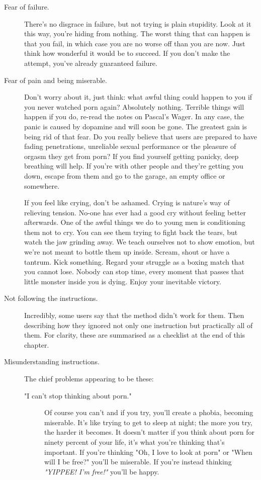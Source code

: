 \documentclass[easypeasy.tex]{subfiles}
\begin{document}
\begin{description}
  \item [Fear of failure.] There's no disgrace in failure, but not trying is plain stupidity. Look at it this way, you're hiding from nothing. The worst thing that can happen is that you fail, in which case you are no worse off than you are now. Just think how wonderful it would be to succeed. If you don't make the attempt, you've already guaranteed failure.

  \item [Fear of pain and being miserable.] Don't worry about it, just think: what awful thing could happen to you if you never watched porn again? Absolutely nothing. Terrible things will happen if you do, re-read the notes on Pascal's Wager. In any case, the panic is caused by dopamine and will soon be gone. The greatest gain is being rid of that fear. Do you really believe that users are prepared to have fading penetrations, unreliable sexual performance or the pleasure of orgasm they get from porn? If you find yourself getting panicky, deep breathing will help. If you're with other people and they're getting you down, escape from them and go to the garage, an empty office or somewhere.

  If you feel like crying, don't be ashamed. Crying is nature's way of relieving tension. No-one has ever had a good cry without feeling better afterwards. One of the awful things we do to young men is conditioning them not to cry. You can see them trying to fight back the tears, but watch the jaw grinding away. We teach ourselves not to show emotion, but we're not meant to bottle them up inside. Scream, shout or have a tantrum. Kick something. Regard your struggle as a boxing match that you cannot lose. Nobody can stop time, every moment that passes that little monster inside you is dying. Enjoy your inevitable victory. 

  \item [Not following the instructions.] Incredibly, some users say that the method didn't work for them. Then describing how they ignored not only one instruction but practically all of them. For clarity, these are summarised as a checklist at the end of this chapter.

  \item [Misunderstanding instructions.] The chief problems appearing to be these:

    \begin{description} 
    \item["I can't stop thinking about porn."]
      Of course you can't and if you try, you'll create a phobia, becoming miserable. It's like trying to get to sleep at night; the more you try, the harder it becomes. It doesn't matter if you think about porn for ninety percent of your life, it's what you're thinking that's important. If you're thinking "Oh, I love to look at porn" or "When will I be free?" you'll be miserable. If you're instead thinking \textit{"YIPPEE! I'm free!"} you'll be happy.


\end{description}
\end{description}
\end{document}
